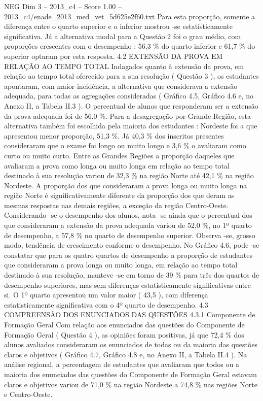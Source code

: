 \begin{textsample}{NEG Dim 3 – 2013\_c4 – Score 1.00 – 2013\_c4/enade\_2013\_med\_vet\_5d625e2f60.txt}
Para esta proporção, somente a diferença entre o quarto superior e o inferior mostrou -se estatisticamente significativa.
Já a alternativa modal para a Questão 2 foi o grau médio, com proporções crescentes com o desempenho : 56,3 \% do quarto inferior e 61,7 \% do superior optaram por esta resposta. 4.2 EXTENSÃO DA PROVA EM RELAÇÃO AO TEMPO TOTAL Indagados quanto à extensão da prova, em relação ao tempo total oferecido para a sua resolução ( Questão 3 ), os estudantes apontaram, com maior incidência, a alternativa que considerava a extensão adequada, para todas as agregações consideradas ( Gráfico 4.5, Gráfico 4.6 e, no Anexo II, a Tabela II.3 ).
O percentual de alunos que responderam ser a extensão da prova adequada foi de 56,0 \%.
Para a desagregação por Grande Região, esta alternativa também foi escolhida pela maioria dos estudantes : Nordeste foi a que apresentou menor proporção, 51,3 \%.
Já 40,3 \% dos inscritos presentes consideraram que o exame foi longo ou muito longo e 3,6 \% o avaliaram como curto ou muito curto.
Entre as Grandes Regiões a proporção daqueles que avaliaram a prova como longa ou muito longa em relação ao tempo total destinado à sua resolução variou de 32,3 \% na região Norte até 42,1 \% na região Nordeste.
A proporção dos que consideraram a prova longa ou muito longa na região Norte é significativamente diferente da proporção dos que deram as mesmas respostas nas demais regiões, a exceção da região Centro-Oeste.
Considerando -se o desempenho dos alunos, nota -se ainda que o percentual dos que consideraram a extensão da prova adequada variou de 52,0 \%, no 1º quarto de desempenho, a 57,8 \% no quarto de desempenho superior.
Observa -se, grosso modo, tendência de crescimento conforme o desempenho.
No Gráfico 4.6, pode -se constatar que para os quatro quartos de desempenho a proporção de estudantes que consideraram a prova longa ou muito longa, em relação ao tempo total destinado à sua resolução, manteve -se em torno de 39 \% para três dos quartos de desempenho superiores, mas sem diferenças estatisticamente significativas entre si.
O 1º quarto apresentou um valor maior ( 43,5 ), com diferença estatisticamente significativa com o 4º quarto de desempenho. 4.3 COMPREENSÃO DOS ENUNCIADOS DAS QUESTÕES 4.3.1 Componente de Formação Geral Com relação aos enunciados das questões do Componente de Formação Geral ( Questão 4 ), as opiniões foram positivas, já que 72,4 \% dos alunos avaliados consideraram os enunciados de todas ou da maioria das questões claros e objetivos ( Gráfico 4.7, Gráfico 4.8 e, no Anexo II, a Tabela II.4 ).
Na análise regional, a percentagem de estudantes que avaliaram que todos ou a maioria dos enunciados das questões do Componente de Formação Geral estavam claros e objetivos variou de 71,0 \% na região Nordeste a 74,8 \% nas regiões Norte e Centro-Oeste.

\end{textsample}
